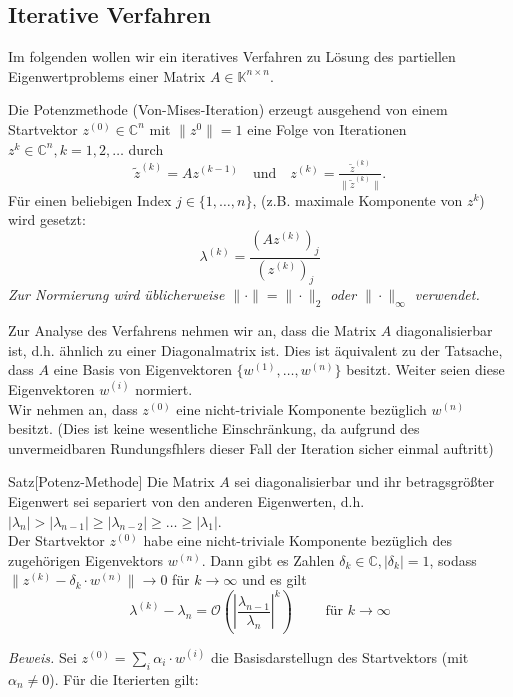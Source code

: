 \documentclass{article}
\begin{document}
    \subsection{Iterative Verfahren}
    Im folgenden wollen wir ein iteratives Verfahren zu Lösung des partiellen Eigenwertproblems einer 
    Matrix $A\in\mathbb{K}^{n\times n}$.
    \begin{defbox}
        Die Potenzmethode (Von-Mises-Iteration) erzeugt ausgehend von einem Startvektor $z^{(0)}\in\mathbb{C}^n$ mit
        $\|z^0\|=1$ eine Folge von Iterationen $z^k\in\mathbb{C}^n, k=1,2,\dotsc$ durch 
        \[\tilde{z}^{(k)}=Az^{(k-1)} \quad\text{und}\quad z^{(k)} = \tfrac{\tilde{z}^{(k)}}{\|\tilde{z}^{(k)}\|}.\]
        Für einen beliebigen  Index $j\in\{1,\dotsc,n\}$, (z.B. maximale Komponente von $z^k$) wird gesetzt:
        \[\lambda^{(k)} = \dfrac{(Az^{(k)})_j}{(z^{(k)})_j}\]
        \textit{Zur Normierung wird üblicherweise $\|\cdot\|=\|\cdot\|_2$ oder $\|\cdot\|_\infty$ verwendet.} 
    \end{defbox}
    Zur Analyse des Verfahrens nehmen wir an, dass die Matrix $A$ diagonalisierbar ist, d.h. ähnlich zu einer 
    Diagonalmatrix ist. Dies ist äquivalent zu der Tatsache, dass $A$ eine Basis von Eigenvektoren 
    $\{w^{(1)},\dotsc,w^{(n)}\}$ besitzt. Weiter seien diese Eigenvektoren $w^{(i)}$ normiert. \\
    Wir nehmen an, dass $z^{(0)}$ eine nicht-triviale Komponente bezüglich $w^{(n)}$ besitzt. 
    (Dies ist keine wesentliche Einschränkung, da aufgrund des unvermeidbaren Rundungsfhlers dieser Fall der 
    Iteration sicher einmal auftritt)
    \begin{thmbox}{Satz}[Potenz-Methode]
        Die Matrix $A$ sei diagonalisierbar und ihr betragsgrößter Eigenwert sei separiert von den anderen 
        Eigenwerten, d.h. $|\lambda_n|>|\lambda_{n-1}|\geq|\lambda_{n-2}|\geq\dotsc\geq|\lambda_1|$. \\ 
        Der Startvektor $z^{(0)}$ habe eine nicht-triviale Komponente bezüglich des zugehörigen Eigenvektors $w^{(n)}$.
        Dann gibt es Zahlen $\delta_k\in\mathbb{C}, |\delta_k|=1$, 
        sodass $\|z^{(k)}-\delta_k\cdot w^{(n)}\|\rightarrow 0$ für $k\rightarrow\infty$ und es gilt
        \[\lambda^{(k)}-\lambda_n = \mathcal{O}\left(\left|\dfrac{\lambda_{n-1}}{\lambda_n}\right|^k\right)\qquad 
        \text{ für } k\rightarrow \infty\]
    \end{thmbox}
    \textit{Beweis.} Sei $z^{(0)}=\sum_i \alpha_i\cdot w^{(i)}$ die Basisdarstellugn des Startvektors 
    (mit $\alpha_n\neq 0$). Für die Iterierten gilt:
\end{document}
